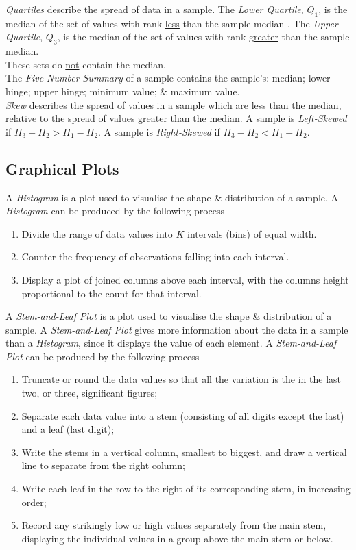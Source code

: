 \documentclass[11pt,a4paper]{article}
\begin{document}
\textit{Quartiles} describe the spread of data in a sample.  The \textit{Lower Quartile}, $Q_1$, is the median of the set of values with rank \underline{less} than the sample median . The \textit{Upper Quartile}, $Q_3$, is the median of the set of values with rank \underline{greater} than the sample median.\\
\NB These sets do \underline{not} contain the median.\\

The \textit{Five-Number Summary} of a sample contains the sample's: median; lower hinge; upper hinge; minimum value; \& maximum value.\\

\textit{Skew} describes the spread of values in a sample which are less than the median, relative to the spread of values greater than the median. A sample is \textit{Left-Skewed} if $H_3-H_2>H_1-H_2$. A sample is \textit{Right-Skewed} if $H_3-H_2<H_1-H_2$.

\subsection{Graphical Plots}

A \textit{Histogram} is a plot used to visualise the shape \& distribution of a sample. A \textit{Histogram} can be produced by the following process
\begin{enumerate}[label=\roman*)]
	\item Divide the range of data values into $K$ intervals (bins) of equal width.
	\item Counter the frequency of observations falling into each interval.
	\item Display a plot of joined columns above each interval, with the columns height proportional to the count for that interval.
\end{enumerate}

A \textit{Stem-and-Leaf Plot} is a plot used to visualise the shape \& distribution of a sample. A \textit{Stem-and-Leaf Plot} gives more information about the data in a sample than a \textit{Histogram}, since it displays the value of each element. A \textit{Stem-and-Leaf Plot} can be produced by the following process
\begin{enumerate}[label=\roman*)]
	\item Truncate or round the data values so that all the variation is the in the last two, or three, significant figures;
	\item Separate each data value into a stem (consisting of all digits except the last) and a leaf (last digit);
	\item Write the stems in a vertical column, smallest to biggest, and draw a vertical line to separate from the right column;
	\item Write each leaf in the row to the right of its corresponding stem, in increasing order;
	\item Record any strikingly low or high values separately from the main stem, displaying the individual values in a group above the main stem or below.
\end{enumerate}
\end{document}
